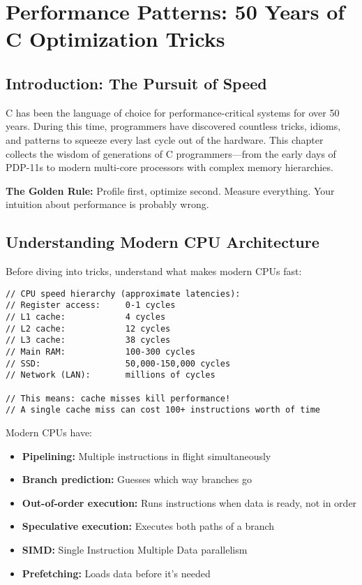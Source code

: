 \chapter{Performance Patterns: 50 Years of C Optimization Tricks}

\section{Introduction: The Pursuit of Speed}

C has been the language of choice for performance-critical systems for over 50 years. During this time, programmers have discovered countless tricks, idioms, and patterns to squeeze every last cycle out of the hardware. This chapter collects the wisdom of generations of C programmers---from the early days of PDP-11s to modern multi-core processors with complex memory hierarchies.

\begin{tipbox}
\textbf{The Golden Rule:} Profile first, optimize second. Measure everything. Your intuition about performance is probably wrong.
\end{tipbox}

\section{Understanding Modern CPU Architecture}

Before diving into tricks, understand what makes modern CPUs fast:

\begin{lstlisting}
// CPU speed hierarchy (approximate latencies):
// Register access:     0-1 cycles
// L1 cache:            4 cycles
// L2 cache:            12 cycles
// L3 cache:            38 cycles
// Main RAM:            100-300 cycles
// SSD:                 50,000-150,000 cycles
// Network (LAN):       millions of cycles

// This means: cache misses kill performance!
// A single cache miss can cost 100+ instructions worth of time
\end{lstlisting}

Modern CPUs have:
\begin{itemize}
    \item \textbf{Pipelining:} Multiple instructions in flight simultaneously
    \item \textbf{Branch prediction:} Guesses which way branches go
    \item \textbf{Out-of-order execution:} Runs instructions when data is ready, not in order
    \item \textbf{Speculative execution:} Executes both paths of a branch
    \item \textbf{SIMD:} Single Instruction Multiple Data parallelism
    \item \textbf{Prefetching:} Loads data before it's needed
\end{itemize}

